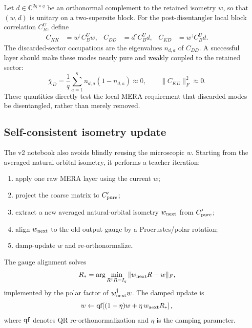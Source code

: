 \documentclass[aps,prb,twocolumn,floatfix]{revtex4-2}
\begin{document}
Let \(d\in\mathbb{C}^{2q\times q}\) be an orthonormal complement to the retained
isometry \(w\), so that \((w,d)\) is unitary on a two-supersite block.  For the
post-disentangler local block correlation \(C_B^U\), define
\begin{align}
  C_{KK} &= w^\dagger C_B^U w, &
  C_{DD} &= d^\dagger C_B^U d, &
  C_{KD} &= w^\dagger C_B^U d .
\end{align}
The discarded-sector occupations are the eigenvalues \(n_{d,a}\) of \(C_{DD}\).
A successful layer should make these modes nearly pure and weakly coupled to
the retained sector:
\begin{equation}
  \overline{\chi}_{D}
  =
  \frac{1}{q}\sum_{a=1}^{q} n_{d,a}(1-n_{d,a})
  \approx 0,
  \qquad
  \|C_{KD}\|_F^2 \approx 0.
  \label{eq:discard-diagnostics}
\end{equation}
These quantities directly test the local MERA requirement that discarded modes
be disentangled, rather than merely removed.

\subsection{Self-consistent isometry update}

The v2 notebook also avoids blindly reusing the microscopic \(w\).  Starting
from the averaged natural-orbital isometry, it performs a teacher iteration:
\begin{enumerate}
\item apply one raw MERA layer using the current \(w\);
\item project the coarse matrix to \(C_{\rm pure}'\);
\item extract a new averaged natural-orbital isometry \(w_{\rm next}\) from
      \(C_{\rm pure}'\);
\item align \(w_{\rm next}\) to the old output gauge by a Procrustes/polar
      rotation;
\item damp-update \(w\) and re-orthonormalize.
\end{enumerate}
The gauge alignment solves
\begin{equation}
  R_*=\arg\min_{R^\dagger R=I_q}\|w_{\rm next}R-w\|_F,
  \label{eq:procrustes}
\end{equation}
implemented by the polar factor of \(w_{\rm next}^\dagger w\).  The damped
update is
\begin{equation}
  w \leftarrow {\rm qf}\!\left[(1-\eta)w+\eta\,w_{\rm next}R_*\right],
  \label{eq:damped-w}
\end{equation}
where \({\rm qf}\) denotes QR re-orthonormalization and \(\eta\) is the damping
parameter.
\end{document}
